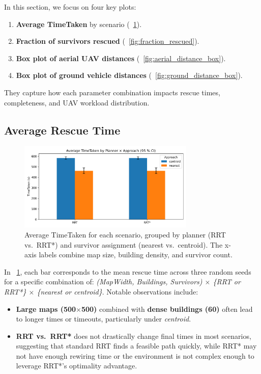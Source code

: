 \documentclass[12pt,a4paper]{report}
\begin{document}
In this section, we focus on four key plots: 
\begin{enumerate}
    \item \textbf{Average TimeTaken} by scenario (\figurename~\ref{fig:avg_time_taken}).
    \item \textbf{Fraction of survivors rescued} (\figurename~\ref{fig:fraction_rescued}).
    \item \textbf{Box plot of aerial UAV distances} (\figurename~\ref{fig:aerial_distance_box}).
    \item \textbf{Box plot of ground vehicle distances} (\figurename~\ref{fig:ground_distance_box}).
\end{enumerate}
They capture how each parameter combination impacts rescue times, completeness,
and UAV workload distribution.

\subsection{Average Rescue Time}
\begin{figure}[H]
    \centering
    \includegraphics[width=0.75\textwidth]{figures/avg_time_taken.png}
    \caption{Average TimeTaken for each scenario, grouped by planner (RRT vs.\ RRT*) 
             and survivor assignment (nearest vs.\ centroid). The x-axis labels 
             combine map size, building density, and survivor count.}
    \label{fig:avg_time_taken}
\end{figure}

\noindent
In \figurename~\ref{fig:avg_time_taken}, each bar corresponds to the mean rescue time
across three random seeds for a specific combination of:
\emph{(MapWidth, Buildings, Survivors) $\times$ \{RRT or RRT*\} $\times$ \{nearest or centroid\}}.
Notable observations include:
\begin{itemize}
    \item \textbf{Large maps (500$\times$500)} combined with \textbf{dense buildings (60)}
          often lead to longer times or timeouts, particularly under \emph{centroid}.
    \item \textbf{RRT vs.\ RRT*} does not drastically change final times in most scenarios,
          suggesting that standard RRT finds a feasible path quickly, while RRT* 
          may not have enough rewiring time or the environment is not complex enough 
          to leverage RRT*'s optimality advantage.
\end{itemize}
\end{document}
